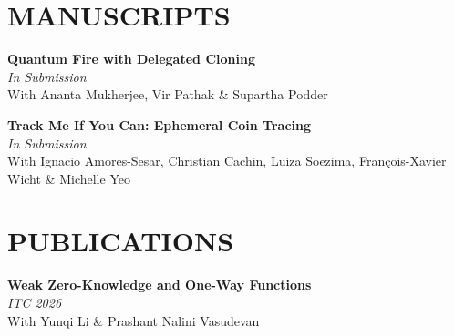 \documentclass[margin]{res}
\begin{document}
\begin{resume}




\section{MANUSCRIPTS}


\textbf{Quantum Fire with Delegated Cloning}\\ {\it In Submission} \\
With Ananta Mukherjee, Vir Pathak \& Supartha Podder

\textbf{Track Me If You Can: Ephemeral Coin Tracing}\\ {\it In Submission} \\
With Ignacio Amores-Sesar, Christian Cachin, Luiza Soezima, Fran\c{c}ois-Xavier Wicht \& Michelle Yeo





\section{PUBLICATIONS}

\textbf{Weak Zero-Knowledge and One-Way Functions}\\ {\it ITC 2026} \\
With Yunqi Li \& Prashant Nalini Vasudevan


\end{resume}
\end{document}
